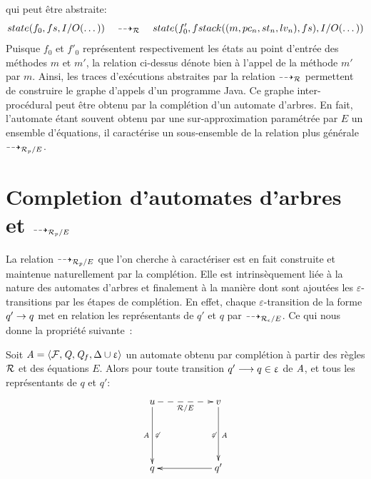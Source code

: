 \noindent qui peut être abstraite:
\[ state(f_0, fs, I/O(\dots)) \quad \dashrightarrow_\mathcal R \quad state(f'_0, fstack((m, pc_n, st_n, lv_n), fs), I/O(\dots)) \]
Puisque $f_0$ et $f'_0$ représentent respectivement les états au point d'entrée des méthodes $m$ et $m'$, la relation ci-dessus
dénote bien à l'appel de la méthode $m'$ par $m$. Ainsi, les traces d'exécutions abstraites par la relation $\dashrightarrow_\mathcal R$
permettent de construire le graphe d'appels d'un programme Java.
Ce graphe inter-procédural peut être obtenu par la complétion d'un automate d'arbres.
En fait, l'automate étant souvent obtenu par une sur-approximation paramétrée par $E$ un ensemble d'équations, il caractérise 
un sous-ensemble de la relation plus générale $\dashrightarrow_{\mathcal R_p/E}$. 

\section{Completion d'automates d'arbres et $\dashrightarrow_{\mathcal R_p/E}$}

La relation $\dashrightarrow_{\mathcal R_p/E}$ que l'on cherche à caractériser est en fait construite
et maintenue naturellement par la complétion. Elle est intrinsèquement liée à la nature
des automates d'arbres et finalement à la manière dont sont ajoutées les  $\varepsilon$-transitions 
par les étapes de complétion. En effet, chaque $\varepsilon$-transition de la forme $q' \rightarrow q$
met en relation les représentants de $q'$ et $q$ par $\dashrightarrow_{\mathcal R_\epsilon/E}$.
Ce qui nous donne la propriété suivante~:

\begin{lemma}
  \label{lem:completion_arw}
  Soit $\mathit A = \langle \mathcal{F}, \mathit Q, \mathit Q_f, \Delta \cup \upvarepsilon\rangle$ un automate obtenu 
  par complétion à partir des règles $\mathcal R$ et des équations $E$.
  Alors pour toute transition $q' \longrightarrow q \in \upvarepsilon$ de $\mathit A$,
  et tous les représentants de $q$ et $q'$:
  \[
  \xymatrix{
    u \ar[dd]_{\A}^{\not\varepsilon} \ar@{-->} [rr]_{\R/E} && v \ar[dd]^{\A}_{\not\varepsilon}\\
    &&\\
    q && q' \ar[ll]
  }
  \]
  
  \end{lemma}

